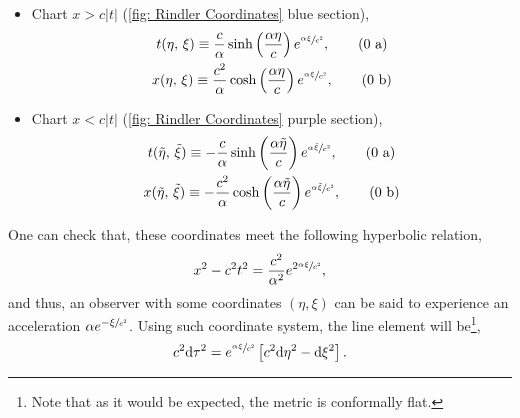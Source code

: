 \begin{itemize}
	\item Chart $x>c|t|$ (\ref{fig: Rindler Coordinates} blue section),
	\begin{subequations}
		\begin{gather}
			t(\eta,\,\xi)\equiv \frac{c}{\alpha}\sinh\left(\frac{\alpha\eta}{c}\right)e^{\sfrac{\alpha\xi}{c^2}},\tag{\theequation \,\,a}\\ x(\eta,\,\xi)\equiv \frac{c^2}{\alpha}\cosh\left(\frac{\alpha\eta}{c}\right)e^{\sfrac{\alpha\xi}{c^2}},\tag{\theequation \,\,b}
		\end{gather}
	\end{subequations}
	\item Chart $x<c|t|$ (\ref{fig: Rindler Coordinates} purple section),
	\begin{subequations}
		\begin{gather}
			t(\tilde\eta,\,\tilde\xi)\equiv- \frac{c}{\alpha}\sinh\left(\frac{\alpha\tilde\eta}{c}\right)e^{\sfrac{\alpha\tilde\xi}{c^2}},\tag{\theequation \,\,a}\\ x(\tilde\eta,\,\tilde\xi)\equiv -\frac{c^2}{\alpha}\cosh\left(\frac{\alpha\tilde\eta}{c}\right)e^{\sfrac{\alpha\tilde\xi}{c^2}},\tag{\theequation \,\,b}
		\end{gather}
	\end{subequations}
\end{itemize}
One can check that, these coordinates meet the following hyperbolic relation,
\begin{equation}\label{eq: Hyperbolic general acceleration Unruh}
	x^2-c^2t^2=\frac{c^2}{\alpha^2}e^{2\sfrac{\alpha\xi}{c^2}},
\end{equation}
and thus, an observer with some coordinates $(\eta,\xi)$ can be said to experience an acceleration $\alpha e^{-\xi\sfrac{}{c^2}}$. Using such coordinate system, the line element will be\footnote{Note that as it would be expected, the metric is conformally flat.},
\begin{equation}
	c^2\text{d} \tau^2=e^{\sfrac{\alpha\xi}{c^2}}\left[c^2\text{d}\eta^2-\text{d}\xi^2\right].
\end{equation}


